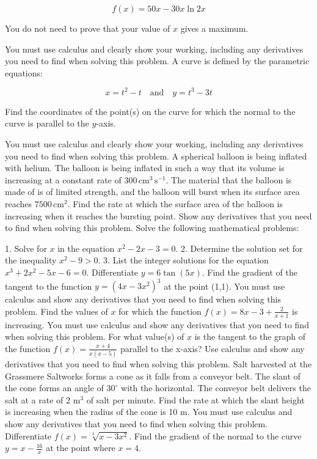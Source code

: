 \documentclass[12pt,addpoints]{exam}
\begin{document}
\begin{questions}
\[ f(x) = 50x - 30x \ln 2x \]

You do not need to prove that your value of \( x \) gives a maximum.

You must use calculus and clearly show your working, including any derivatives you need to find when solving this problem.
\fillwithlines{3cm}
\question[5] A curve is defined by the parametric equations:

\[ x = t^2 - t \quad \text{and} \quad y = t^3 - 3t \]

Find the coordinates of the point(s) on the curve for which the normal to the curve is parallel to the \( y \)-axis.

You must use calculus and clearly show your working, including any derivatives you need to find when solving this problem.
\fillwithlines{3cm}
\question[5] A spherical balloon is being inflated with helium. The balloon is being inflated in such a way that its volume is increasing at a constant rate of \(300 \, \text{cm}^3 \, \text{s}^{-1}\). The material that the balloon is made of is of limited strength, and the balloon will burst when its surface area reaches \(7500 \, \text{cm}^2\). Find the rate at which the surface area of the balloon is increasing when it reaches the bursting point. Show any derivatives that you need to find when solving this problem.
\fillwithlines{3cm}
\question[5] Solve the following mathematical problems:

1. Solve for \(x\) in the equation \(x^2 - 2x - 3 = 0\).
2. Determine the solution set for the inequality \(x^2 - 9 > 0\).
3. List the integer solutions for the equation \(x^3 + 2x^2 - 5x - 6 = 0\).
\fillwithlines{3cm}
\question[5] Differentiate \( y = 6 \tan(5x) \).
\fillwithlines{3cm}
\question[5] Find the gradient of the tangent to the function \( y = (4x - 3x^2)^3 \) at the point (1,1). You must use calculus and show any derivatives that you need to find when solving this problem.
\fillwithlines{3cm}
\question[5] Find the values of \( x \) for which the function \( f(x) = 8x - 3 + \frac{2}{x+1} \) is increasing. You must use calculus and show any derivatives that you need to find when solving this problem.
\fillwithlines{3cm}
\question[5] For what value(s) of \( x \) is the tangent to the graph of the function \( f(x) = \frac{x+4}{x(x-5)} \) parallel to the x-axis? Use calculus and show any derivatives that you need to find when solving this problem.
\fillwithlines{3cm}
\question[5] Salt harvested at the Grassmere Saltworks forms a cone as it falls from a conveyor belt. The slant of the cone forms an angle of \(30^\circ\) with the horizontal. The conveyor belt delivers the salt at a rate of 2 m\(^3\) of salt per minute. Find the rate at which the slant height is increasing when the radius of the cone is 10 m. You must use calculus and show any derivatives that you need to find when solving this problem.
\fillwithlines{3cm}
\question[5] Differentiate \( f(x) = \sqrt[3]{x - 3x^2} \).
\fillwithlines{3cm}
\question[5] Find the gradient of the normal to the curve \( y = x - \frac{16}{x} \) at the point where \( x = 4 \).


\end{questions}
\end{document}
